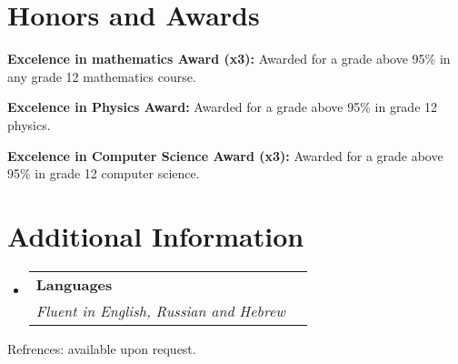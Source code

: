 \documentclass[a4paper,20pt]{article}
\makeatletter
\newcommand{\resumeSubheading}[4]{
	\vspace{-1pt}\item
	\begin{tabular*}{0.97\textwidth}{l@{\extracolsep{\fill}}r}
		\textbf{#1} & #2 \\
		\textit{#3} & \textit{#4} \\
	\end{tabular*}\vspace{-5pt}
}
\newcommand{\resumeSubHeadingListStart}{\begin{itemize}[leftmargin=*]}
\newcommand{\resumeSubHeadingListEnd}{\end{itemize}}
\makeatother
\begin{document}
	\section{Honors and Awards}
	\begin{description}[font=$\bullet$]
		\item {\textbf{Excelence in mathematics Award (x3):} Awarded for a grade above 95\% in any grade 12 mathematics course.}
		\vspace{-5pt}
		\item {\textbf{Excelence in Physics Award:} Awarded for a grade above 95\% in grade 12 physics.}
		\vspace{-5pt}
		\item {\textbf{Excelence in Computer Science Award (x3):} Awarded for a grade above 95\% in grade 12 computer science.}
		
	\end{description}
	
	\vspace{-5pt}
	\section{Additional Information}
	\resumeSubHeadingListStart
	\resumeSubheading
	{Languages}{}
	{Fluent in English, Russian and Hebrew}{}
	\vspace{5pt}
	\resumeSubHeadingListEnd
	\begin{center}
		Refrences: available upon request.
	\end{center}
	
\end{document}
